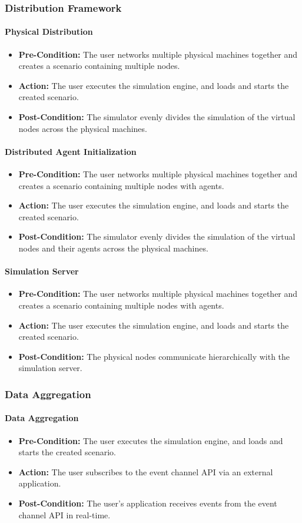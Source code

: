 \documentclass[titlepage]{article}
\newcommand{\testentry}[4]{
    \paragraph{#1}
    \begin{itemize}
        \item \textbf{Pre-Condition:} #2
        \item \textbf{Action:} #3
        \item \textbf{Post-Condition:} #4
    \end{itemize}
}
\begin{document}
\subsubsection{Distribution Framework}
    \testentry{Physical Distribution}{
        The user networks multiple physical machines together and creates a scenario containing multiple nodes.
    }{
        The user executes the simulation engine, and loads and starts the created scenario.
    }{
        The simulator evenly divides the simulation of the virtual nodes across the physical machines.
    }
    \testentry{Distributed Agent Initialization}{
        The user networks multiple physical machines together and creates a scenario containing multiple nodes with agents.
    }{
        The user executes the simulation engine, and loads and starts the created scenario.
    }{
        The simulator evenly divides the simulation of the virtual nodes and their agents across the physical machines.
    }
    \testentry{Simulation Server}{
        The user networks multiple physical machines together and creates a scenario containing multiple nodes with agents.
    }{
        The user executes the simulation engine, and loads and starts the created scenario.
    }{
        The physical nodes communicate hierarchically with the simulation server.
    }


\subsubsection{Data Aggregation}
    \testentry{Data Aggregation}{
        The user executes the simulation engine, and loads and starts the created scenario.
    }{
        The user subscribes to the event channel API via an external application.
    }{
        The user's application receives events from the event channel API in real-time.
    }
\end{document}
